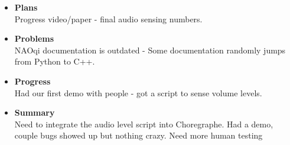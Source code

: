 \begin{itemize}
\begin{itemize}
				\item \textbf{Plans} \\
				Progress video/paper - final audio sensing numbers.
				\item \textbf{Problems} \\
				NAOqi documentation is outdated - Some documentation randomly jumps from Python to C++.
				\item \textbf{Progress} \\
				Had our first demo with people - got a script to sense volume levels.
				\item \textbf{Summary} \\
				Need to integrate the audio level script into Choregraphe. Had a demo, couple bugs showed up but nothing crazy. Need more human testing
			\end{itemize}
	\end{itemize}

